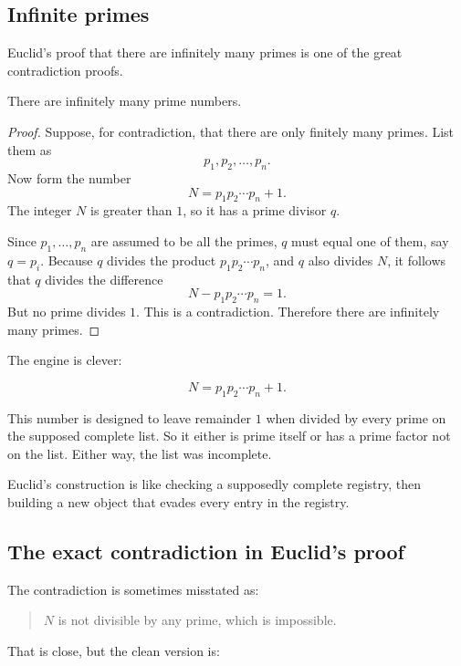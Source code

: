 \subsection{Infinite primes}

Euclid's proof that there are infinitely many primes is one of the great contradiction proofs.

\begin{theorem}
There are infinitely many prime numbers.
\end{theorem}

\begin{proof}
Suppose, for contradiction, that there are only finitely many primes. List them as
\[
p_1,p_2,\ldots,p_n.
\]
Now form the number
\[
N=p_1p_2\cdots p_n+1.
\]
The integer $N$ is greater than $1$, so it has a prime divisor $q$.

Since $p_1,\ldots,p_n$ are assumed to be all the primes, $q$ must equal one of them, say $q=p_i$. Because $q$ divides the product $p_1p_2\cdots p_n$, and $q$ also divides $N$, it follows that $q$ divides the difference
\[
N-p_1p_2\cdots p_n=1.
\]
But no prime divides $1$. This is a contradiction. Therefore there are infinitely many primes.
\end{proof}

The engine is clever:

\[
N=p_1p_2\cdots p_n+1.
\]

This number is designed to leave remainder $1$ when divided by every prime on the supposed complete list. So it either is prime itself or has a prime factor not on the list. Either way, the list was incomplete.

\begin{intuitionbox}
Euclid's construction is like checking a supposedly complete registry, then building a new object that evades every entry in the registry.
\end{intuitionbox}

\subsection{The exact contradiction in Euclid's proof}

The contradiction is sometimes misstated as:

\begin{quote}
$N$ is not divisible by any prime, which is impossible.
\end{quote}

That is close, but the clean version is:

